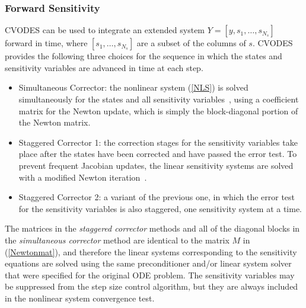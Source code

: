 \subsubsection{Forward Sensitivity}
CVODES can be used to integrate an extended system
$Y = [y,s_1,\ldots,s_{N_s}]$ forward in time, where
$[s_1,\ldots,s_{N_s}]$ are a subset of the columns of $s$.
%
CVODES provides the following three choices for the sequence in which
the states and sensitivity variables are advanced in time at each step.
%
\begin{itemize}
\item Simultaneous Corrector: the nonlinear system (\ref{NLS}) is solved
  simultaneously for the states and all sensitivity variables~\cite{MaPe:96},
  using a coefficient matrix for the Newton update, which is
  simply the block-diagonal portion of the Newton matrix.
\item Staggered Corrector 1: the correction stages for the sensitivity
  variables take place after the states have been corrected and have passed
  the error test. To prevent frequent Jacobian updates, the linear sensitivity
  systems are solved with a modified Newton iteration~\cite{FTB:97}.
\item Staggered Corrector 2: a variant of the previous one,
  in which the error test for the sensitivity variables is also staggered,
  one sensitivity system at a time.
\end{itemize}
%
The matrices in the {\em staggered corrector} methods and all of the
diagonal blocks in the {\em simultaneous corrector} method are
identical to the matrix $M$ in (\ref{Newtonmat}), and
therefore the linear systems corresponding to the sensitivity equations
are solved using the same preconditioner and/or linear system solver that
were specified for the original ODE problem.
The sensitivity variables may be suppressed from the step size control
algorithm, but they are always included in the nonlinear system convergence
test.

